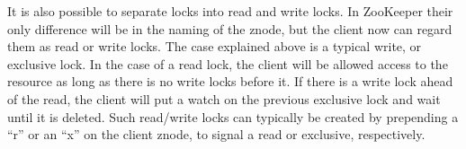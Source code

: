 It is also possible to separate locks into read and write locks. In ZooKeeper their only difference will be in the naming of the znode, but the client now can regard them as read or write locks. The case explained above is a typical write, or exclusive lock. In the case of a read lock, the client will be allowed access to the resource as long as there is no write locks before it. If there is a write lock ahead of the read, the client will put a watch on the previous exclusive lock and wait until it is deleted. Such read/write locks can typically be created by prepending a ``r'' or an ``x'' on the client znode, to signal a read or exclusive, respectively.



